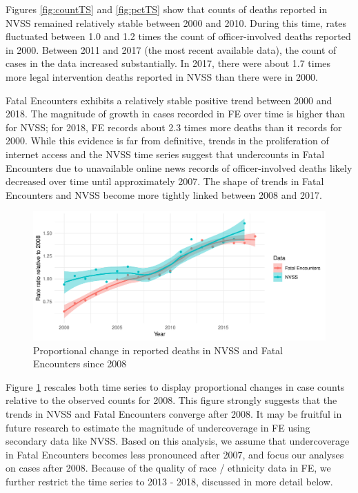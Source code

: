 \documentclass{article}
\begin{document}
Figures \ref{fig:countTS} and \ref{fig:pctTS} show that counts of deaths reported in NVSS remained relatively stable between 2000 and 2010. During this time, rates fluctuated between 1.0 and 1.2 times the count of officer-involved deaths reported in 2000. Between 2011 and 2017 (the most recent available data), the count of cases in the data increased substantially. In 2017, there were about 1.7 times more legal intervention deaths reported in NVSS than there were in 2000. 

Fatal Encounters exhibits a relatively stable positive trend between 2000 and 2018. The magnitude of growth in cases recorded in FE over time is higher than for NVSS; for 2018, FE records about 2.3 times more deaths than it records for 2000. While this evidence is far from definitive, trends in the proliferation of internet access and the NVSS time series suggest that undercounts in Fatal Encounters due to unavailable online news records of officer-involved deaths likely decreased over time until approximately 2007. The shape of trends in Fatal Encounters and NVSS become more tightly linked between 2008 and 2017. 

\begin{figure}
	\centering
	\includegraphics[width = \linewidth]{vis/nvss_fe_pct_08.pdf}
	\caption{Proportional change in reported deaths in NVSS and Fatal Encounters since 2008}
	\label{fig:pct_08}
\end{figure}

Figure \ref{fig:pct_08} rescales both time series to display proportional changes in case counts relative to the observed counts for 2008. This figure strongly suggests that the trends in NVSS and Fatal Encounters converge after 2008. It may be fruitful in future research to estimate the magnitude of undercoverage in FE using secondary data like NVSS. Based on this analysis, we assume that undercoverage in Fatal Encounters becomes less pronounced after 2007, and focus our analyses on cases after 2008. Because of the quality of race / ethnicity data in FE, we further restrict the time series to 2013 - 2018, discussed in more detail below.
\end{document}
